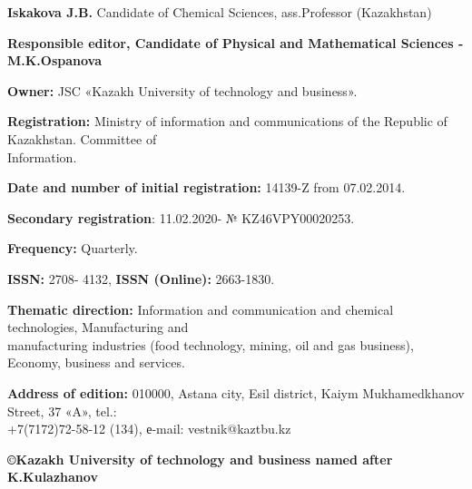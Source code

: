 {\textbf{Iskakova J.B.} Candidate of Chemical Sciences, ass.Professor
(Kazakhstan)

\begin{center}
\textbf{Responsible editor, Candidate of Physical and Mathematical Sciences - M.K.Ospanova}
\end{center}

\textbf{Owner:} JSC «Kazakh University of technology and business».

\textbf{Registration:} Ministry of information and communications of the Republic of Kazakhstan. Committee of \\Information.

\textbf{Date and number of initial registration:} 14139-Z from 07.02.2014.

\textbf{Secondary registration}: 11.02.2020- № KZ46VPY00020253.

\textbf{Frequency:} Quarterly.

\textbf{ISSN:} 2708- 4132, \textbf{ISSN (Online):} 2663-1830.

\textbf{Thematic direction:} Information and communication and chemical
technologies, Manufacturing and \\manufacturing industries (food
technology, mining, oil and gas business), Economy, business and services.

\textbf{Address of edition:} 010000, Astana city, Esil district, Kaiym
Mukhamedkhanov Street, 37 «A», tel.: \\+7(7172)72-58-12 (134),
е-mail: vestnik@kaztbu.kz
\vfill
\begin{center}
\textbf{\normalsize ©Kazakh University of technology and business named after K.Kulazhanov}
\end{center}
}
\pagebreak

